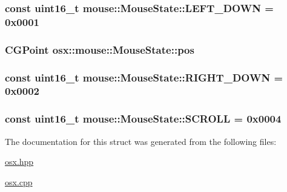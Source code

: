 \hypertarget{structosx_1_1mouse_1_1_mouse_state_a9490a7acba9726f815fa3246985da50b}{
\subsubsection[{L\-E\-F\-T\-\_\-\-D\-O\-W\-N}]{\setlength{\rightskip}{0pt plus 5cm}const uint16\-\_\-t {\bf mouse\-::\-Mouse\-State\-::\-L\-E\-F\-T\-\_\-\-D\-O\-W\-N} = 0x0001}}\label{structosx_1_1mouse_1_1_mouse_state_a9490a7acba9726f815fa3246985da50b}
\hypertarget{structosx_1_1mouse_1_1_mouse_state_a046eeff3d384ad60cf22e3650b5ee0a4}{
\subsubsection[{pos}]{\setlength{\rightskip}{0pt plus 5cm}C\-G\-Point {\bf osx\-::mouse\-::\-Mouse\-State\-::pos}}}\label{structosx_1_1mouse_1_1_mouse_state_a046eeff3d384ad60cf22e3650b5ee0a4}
\hypertarget{structosx_1_1mouse_1_1_mouse_state_a23bf52536a66f3ca8f3d1cebb0f401ee}{
\subsubsection[{R\-I\-G\-H\-T\-\_\-\-D\-O\-W\-N}]{\setlength{\rightskip}{0pt plus 5cm}const uint16\-\_\-t {\bf mouse\-::\-Mouse\-State\-::\-R\-I\-G\-H\-T\-\_\-\-D\-O\-W\-N} = 0x0002}}\label{structosx_1_1mouse_1_1_mouse_state_a23bf52536a66f3ca8f3d1cebb0f401ee}
\hypertarget{structosx_1_1mouse_1_1_mouse_state_a09e8666395882198d1bca0a745f216df}{
\subsubsection[{S\-C\-R\-O\-L\-L}]{\setlength{\rightskip}{0pt plus 5cm}const uint16\-\_\-t {\bf mouse\-::\-Mouse\-State\-::\-S\-C\-R\-O\-L\-L} = 0x0004}}\label{structosx_1_1mouse_1_1_mouse_state_a09e8666395882198d1bca0a745f216df}


The documentation for this struct was generated from the following files\-:\begin{DoxyCompactItemize}
\item 
\hyperlink{osx_8hpp}{osx.\-hpp}\item 
\hyperlink{osx_8cpp}{osx.\-cpp}\end{DoxyCompactItemize}
